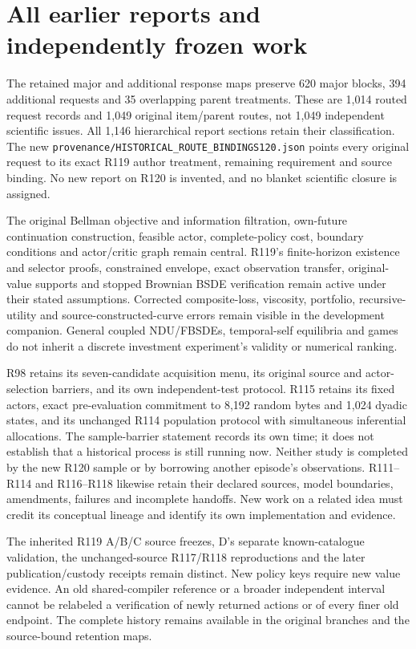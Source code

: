 \section{All earlier reports and independently frozen work}
The retained major and additional response maps preserve 620 major blocks,
394 additional requests and 35 overlapping parent treatments. These are
1,014 routed request records and 1,049 original item/parent routes, not
1,049 independent scientific issues. All 1,146 hierarchical report sections
retain their classification. The new
\nolinkurl{provenance/HISTORICAL_ROUTE_BINDINGS120.json}
points every original request to its exact R119 author treatment, remaining
requirement and source binding. No new report on R120 is invented, and no
blanket scientific closure is assigned.

The original Bellman objective and information filtration, own-future
continuation construction, feasible actor, complete-policy cost, boundary
conditions and actor/critic graph remain central. R119's finite-horizon
existence and selector proofs, constrained envelope, exact observation
transfer, original-value supports and stopped Brownian BSDE verification
remain active under their stated assumptions. Corrected composite-loss,
viscosity, portfolio, recursive-utility and source-constructed-curve errors
remain visible in the development companion. General coupled NDU/FBSDEs,
temporal-self equilibria and games do not inherit a discrete investment
experiment's validity or numerical ranking.

R98 retains its seven-candidate acquisition menu, its original source and
actor-selection barriers, and its own independent-test protocol. R115
retains its fixed actors, exact pre-evaluation commitment to 8,192 random
bytes and 1,024 dyadic states, and its unchanged R114 population protocol
with simultaneous inferential allocations. The sample-barrier statement
records its own time; it does not establish that a historical process is
still running now. Neither study is completed by the new R120 sample
or by borrowing another episode's observations. R111--R114 and
R116--R118 likewise retain their declared sources, model boundaries,
amendments, failures and incomplete handoffs. New work on a related idea
must credit its conceptual lineage and identify its own implementation
and evidence.

The inherited R119 A/B/C source freezes, D's separate known-catalogue
validation, the unchanged-source R117/R118 reproductions and the later
publication/custody receipts remain distinct. New policy keys require new
value evidence. An old shared-compiler reference or a broader independent
interval cannot be relabeled a verification of newly returned actions or
of every finer old endpoint. The complete history remains available in
the original branches and the source-bound retention maps.

